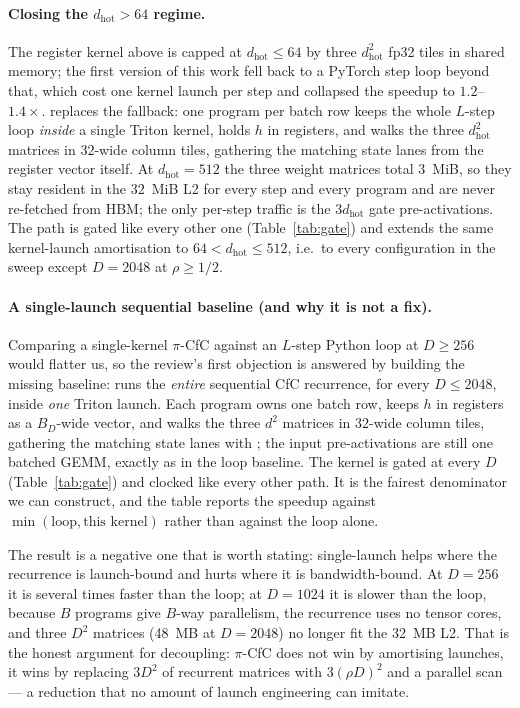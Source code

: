 \documentclass[11pt]{article}
\theoremstyle{definition}
\newcommand{\code}[1]{\texttt{\detokenize{#1}}}
\begin{document}
\paragraph{Closing the $d_{\text{hot}}>64$ regime.} The register kernel above is capped at $d_{\text{hot}}\le64$
by three $d_{\text{hot}}^2$ fp32 tiles in shared memory; the first version of this work fell back to a
PyTorch step loop beyond that, which cost one kernel launch per step and collapsed the speedup to
$1.2$--$1.4\times$. \code{_hot_l2} replaces the fallback: one program per batch row keeps the whole
$L$-step loop \emph{inside} a single Triton kernel, holds $h$ in registers, and walks the three
$d_{\text{hot}}^2$ matrices in $32$-wide column tiles, gathering the matching state lanes from the register
vector itself. At $d_{\text{hot}}=512$ the three weight matrices total $3$~MiB, so they stay resident in the
$32$~MiB L2 for every step and every program and are never re-fetched from HBM; the only per-step traffic is
the $3d_{\text{hot}}$ gate pre-activations. The path is gated like every other one
(Table~\ref{tab:gate}) and extends the same kernel-launch amortisation to $64<d_{\text{hot}}\le512$, i.e.\ to
every configuration in the sweep except $D=2048$ at $\rho\ge1/2$.

\paragraph{A single-launch sequential baseline (and why it is not a fix).} Comparing a
single-kernel $\pi$-CfC against an $L$-step Python loop at $D\ge256$ would flatter us, so the
review's first objection is answered by building the missing baseline: \code{_seq_l2} runs the
\emph{entire} sequential CfC recurrence, for every $D\le2048$, inside \emph{one} Triton launch.
Each program owns one batch row, keeps $h$ in registers as a $B_D$-wide vector, and walks the
three $d^2$ matrices in $32$-wide column tiles, gathering the matching state lanes with
\code{tl.gather}; the input pre-activations are still one batched GEMM, exactly as in the loop
baseline. The kernel is gated at every $D$ (Table~\ref{tab:gate}) and clocked like every other
path. It is the fairest denominator we can construct, and the table reports the speedup against
$\min(\text{loop},\text{this kernel})$ rather than against the loop alone.

The result is a negative one that is worth stating: single-launch helps where the recurrence is
launch-bound and hurts where it is bandwidth-bound. At $D=256$ it is several times faster than
the loop; at $D=1024$ it is slower than the loop, because $B$ programs give $B$-way parallelism,
the recurrence uses no tensor cores, and three $D^2$ matrices (48~MB at $D=2048$) no longer fit
the 32~MB L2. That is the honest argument for decoupling: $\pi$-CfC does not win by amortising
launches, it wins by replacing $3D^2$ of recurrent matrices with $3(\rho D)^2$ and a parallel
scan --- a reduction that no amount of launch engineering can imitate.
\end{document}
